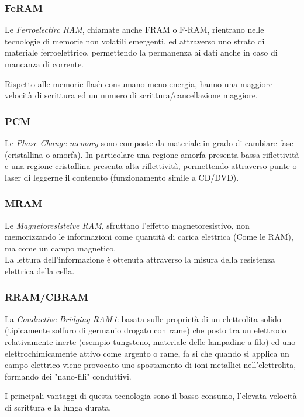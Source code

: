\documentclass[../template]{subfiles}
\begin{document}
\subsubsection{FeRAM}
Le \textit{Ferroelectirc RAM}, chiamate anche FRAM o F-RAM, rientrano nelle tecnologie di memorie non volatili emergenti, ed attraverso uno strato di materiale ferroelettrico, permettendo la permanenza ai dati anche in caso di mancanza di corrente.

Rispetto alle memorie flash consumano meno energia, hanno una maggiore velocità di scrittura ed un numero di scrittura/cancellazione maggiore.
\subsubsection{PCM}
Le \textit{Phase Change memory} sono composte da materiale in grado di cambiare fase (cristallina o amorfa). In particolare una regione amorfa presenta bassa riflettività e una regione cristallina presenta alta riflettività, permettendo attraverso punte o laser di leggerne il contenuto (funzionamento simile a CD/DVD).

\subsubsection{MRAM}
Le \textit{Magnetoresisteive RAM}, sfruttano l'effetto magnetoresistivo, non memorizzando le informazioni come quantità di carica elettrica (Come le RAM), ma come un campo magnetico.
\\
La lettura dell'informazione è ottenuta attraverso la misura della resistenza elettrica della cella.

\subsubsection{RRAM/CBRAM}
La \textit{Conductive Bridging RAM} è basata sulle proprietà di un elettrolita solido (tipicamente solfuro di germanio drogato con rame) che posto tra un elettrodo relativamente inerte (esempio tungsteno, materiale delle lampadine a filo) ed uno elettrochimicamente attivo  come argento o rame, fa si che quando si applica un campo elettrico viene provocato uno spostamento di ioni metallici nell'elettrolita, formando dei "nano-fili" conduttivi.

I principali vantaggi di questa tecnologia sono il basso consumo, l'elevata velocità di scrittura e la lunga durata.
\end{document}
